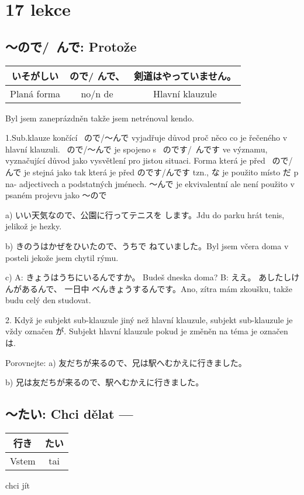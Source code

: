 \section{17 lekce}
\label{sec:lekce_17}

\subsection{ 〜ので/~んで: Protože}
\begin{center}
\begin{tabular}{|c|c|c|}
 \hline
いそがしい &ので/ んで、& 剣道はやっていません。\\
\hline
Planá forma& no/n de&Hlavní klauzule\\
\hline
\end{tabular}
\end{center}
Byl jsem zaneprázdněn takže jsem netrénoval kendo.

1.Sub.klauze končící  ~ので/〜んで vyjadřuje důvod proč něco co je řečeného v hlavní klauzuli. ~ので/〜んで je spojeno s ~のです/~んです ve významu, vyznačující důvod jako vysvětlení pro jistou situaci. Forma která je před  ~ので/ んで  je stejná jako tak která je před  のです/んです tzn., な je použito místo  だ p na- adjectivech a podstatných jménech.  〜んで je ekvivalentní ale není použito v psaném projevu jako  〜ので 

a) いい天気なので、公園に行ってテニスを します。Jdu do parku hrát tenis, jelikož je hezky.

b) きのうはかぜをひいたので、うちで ねていました。Byl jsem včera doma v posteli jekože jsem chytil rýmu.

c) 
A: きょうはうちにいるんですか。 Budeš dneska doma?
B: ええ。 あしたしけんがあるんで、 一日中 べんきょうするんです。Ano, zítra mám zkoušku, takže budu celý den studovat.


2. Když je subjekt sub-klauzule jiný než hlavní klauzule, subjekt sub-klauzule je vždy označen が. Subjekt hlavní klauzule pokud je změněn na téma je označen は. 

Porovnejte:
a) 友だちが来るので、兄は駅へむかえに行きました。

b) 兄は友だちが来るので、駅へむかえに行きました。

\subsection{ 〜たい: Chci dělat ---}
\begin{center}
\begin{tabular}{|c|c|}
\hline
行き& たい\\
\hline
Vstem&tai\\
\hline
\end{tabular}
\end{center}
chci jít

